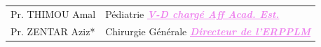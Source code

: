 \begin{table}[H]

  \begin{tabular}{l l}

Pr. THIMOU Amal & \hspace*{6em} Pédiatrie \textcolor{violet}{\textbf{\emph{\underline{V-D chargé Aff Acad. Est.}}}} \\
Pr. ZENTAR Aziz* & \hspace*{6em} Chirurgie Générale \textcolor{violet}{\textbf{\emph{\underline{Directeur de l'ERPPLM}}}} \\

\end{tabular}
\end{table}

\begin{table}[H]


\end{table}
